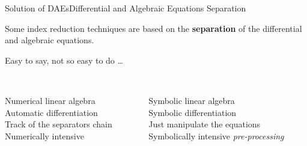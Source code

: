\begin{frame}{Solution of \aclp{DAE}}{Differential and Algebraic Equations Separation}
  \begin{bbox}
    Some index reduction techniques are based on the \textbf{separation} of the differential and algebraic equations.
  \end{bbox}
  \vspace{1.0em}
  Easy to say, not so easy to do \dots
  \vspace{0.5em}
  \begin{columns}
    \centering
    \begin{column}[t]{0.45\textwidth}
      \centering
       \\
      \centering\small
      \textcolor{mycolor5!90!black}{Numerical linear algebra} \\
      \textcolor{mycolor3!90!black}{Automatic differentiation} \\
      \textcolor{mycolor2!90!black}{Track of the separators chain} \\
      \textcolor{mycolor5!90!black}{Numerically intensive}
    \end{column}
    \begin{column}[t]{0.45\textwidth}
      \centering
       \\
      \centering\small
      \textcolor{mycolor3!90!black}{Symbolic linear algebra} \\
      \textcolor{mycolor5!90!black}{Symbolic differentiation} \\
      \textcolor{mycolor5!90!black}{Just manipulate the equations} \\
      \textcolor{mycolor3!90!black}{Symbolically intensive \emph{pre-processing}}
    \end{column}
  \end{columns}
\end{frame}

